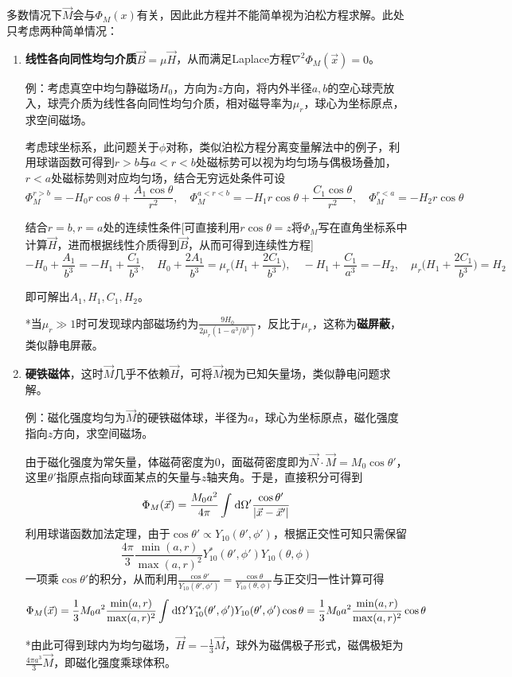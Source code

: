 \documentclass[a4paper,UTF8,fontset=windows]{ctexart}
\newcommand*{\dr}{\hspace{0.07em}\mathrm{d}}
\newcommand*{\vb}{\vec{B}}
\newcommand*{\vh}{\vec{H}}
\newcommand*{\vm}{\vec{M}}
\newcommand*{\vn}{\vec{N}}
\newcommand*{\vx}{\vec{x}}
\begin{document}
多数情况下$\vm$会与$\Phi_M(x)$有关，因此此方程并不能简单视为泊松方程求解。此处只考虑两种简单情况：
\begin{enumerate}
    \item \textbf{线性各向同性均匀介质}$\vb=\mu\vh$，从而满足Laplace方程$\nabla^2\Phi_M(\vx)=0$。
    
    例：考虑真空中均匀静磁场$H_0$，方向为$z$方向，将内外半径$a,b$的空心球壳放入，球壳介质为线性各向同性均匀介质，相对磁导率为$\mu_r$，球心为坐标原点，求空间磁场。

    考虑球坐标系，此问题关于$\phi$对称，类似泊松方程分离变量解法中的例子，利用球谐函数可得到$r>b$与$a<r<b$处磁标势可以视为均匀场与偶极场叠加，$r<a$处磁标势则对应均匀场，结合无穷远处条件可设
    $$\Phi_M^{r>b}=-H_0r\cos\theta+\frac{A_1\cos\theta}{r^2},\quad\Phi_M^{a<r<b}=-H_1r\cos\theta+\frac{C_1\cos\theta}{r^2},\quad\Phi_M^{r<a}=-H_2r\cos\theta$$

    结合$r=b,r=a$处的连续性条件[可直接利用$r\cos\theta=z$将$\Phi_M$写在直角坐标系中计算$\vh$，进而根据线性介质得到$\vb$，从而可得到连续性方程]
    $$-H_0+\frac{A_1}{b^3}=-H_1+\frac{C_1}{b^3},\quad H_0+\frac{2A_1}{b^3}=\mu_r\bigg(H_1+\frac{2C_1}{b^3}\bigg),\quad-H_1+\frac{C_1}{a^3}=-H_2,\quad\mu_r\bigg(H_1+\frac{2C_1}{b^3}\bigg)=H_2$$

    即可解出$A_1,H_1,C_1,H_2$。

    *当$\mu_r\gg1$时可发现球内部磁场约为$\frac{9H_0}{2\mu_r(1-a^3/b^3)}$，反比于$\mu_r$，这称为\textbf{磁屏蔽}，类似静电屏蔽。

    \item \textbf{硬铁磁体}，这时$\vm$几乎不依赖$\vh$，可将$\vm$视为已知矢量场，类似静电问题求解。
    
    例：磁化强度均匀为$\vm$的硬铁磁体球，半径为$a$，球心为坐标原点，磁化强度指向$z$方向，求空间磁场。

    由于磁化强度为常矢量，体磁荷密度为0，面磁荷密度即为$\vn\cdot\vm=M_0\cos\theta'$，这里$\theta'$指原点指向球面某点的矢量与$z$轴夹角。于是，直接积分可得到
    $$\Phi_M(\vx)=\frac{M_0a^2}{4\pi}\int\dr\Omega'\frac{\cos\theta'}{|\vx-\vx'|}$$
    利用球谐函数加法定理，由于$\cos\theta'\propto Y_{10}(\theta',\phi')$，根据正交性可知只需保留
    $$\frac{4\pi}{3}\frac{\min(a,r)}{\max(a,r)^2}Y_{10}^*(\theta',\phi')Y_{10}(\theta,\phi)$$
    一项乘$\cos\theta'$的积分，从而利用$\frac{\cos\theta'}{Y_{10}(\theta',\phi')}=\frac{\cos\theta}{Y_{10}(\theta,\phi)}$与正交归一性计算可得
    $$\Phi_M(\vx)=\frac{1}{3}M_0a^2\frac{\min(a,r)}{\max(a,r)^2}\int\dr\Omega'Y_{10}^*(\theta',\phi')Y_{10}(\theta',\phi')\cos\theta=\frac{1}{3}M_0a^2\frac{\min(a,r)}{\max(a,r)^2}\cos\theta$$

    *由此可得到球内为均匀磁场，$\vh=-\frac{1}{3}\vm$，球外为磁偶极子形式，磁偶极矩为$\frac{4\pi a^3}{3}\vm$，即磁化强度乘球体积。
\end{enumerate}
\end{document}
